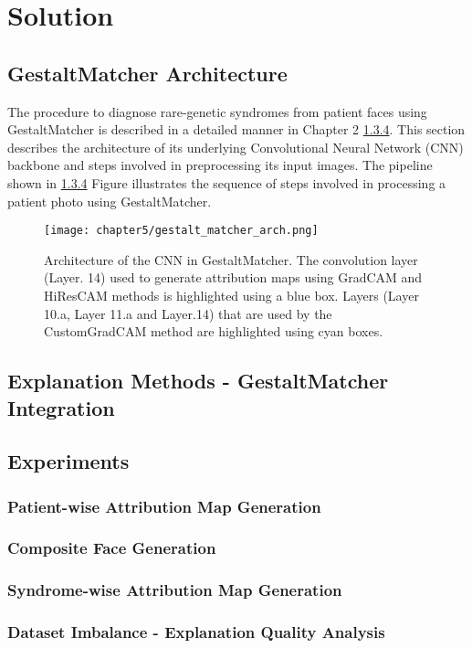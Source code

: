 \documentclass[../report.tex]{subfiles}
\begin{document}
    \chapter{Solution}
    \section{GestaltMatcher Architecture}
    The procedure to diagnose rare-genetic syndromes from patient faces using GestaltMatcher is described in a detailed manner in Chapter 2 \ref{}. This section describes the architecture of its underlying Convolutional Neural Network (CNN) backbone and steps involved in preprocessing its input images. The pipeline shown in \ref{} Figure illustrates the sequence of steps involved in processing a patient photo using GestaltMatcher.
    \begin{figure}[ht]
     \hspace*{1.0cm}      
     \texttt{[image: chapter5/gestalt\_matcher\_arch.png]}
     \caption{Architecture of the CNN in GestaltMatcher. The convolution layer (Layer. 14) used to generate attribution maps using GradCAM and HiResCAM methods
     is highlighted using a blue box. Layers (Layer 10.a, Layer 11.a and Layer.14) that are used by the CustomGradCAM method are highlighted using cyan boxes. }
     \label{fig_arch_gest_matcher}
    \end{figure}
    \section{Explanation Methods - GestaltMatcher Integration}
    \section{Experiments}
    \subsection{Patient-wise Attribution Map Generation}
    \subsection{Composite Face Generation}
    \subsection{Syndrome-wise Attribution Map Generation}
    \subsection{Dataset Imbalance - Explanation Quality Analysis}
\end{document}
